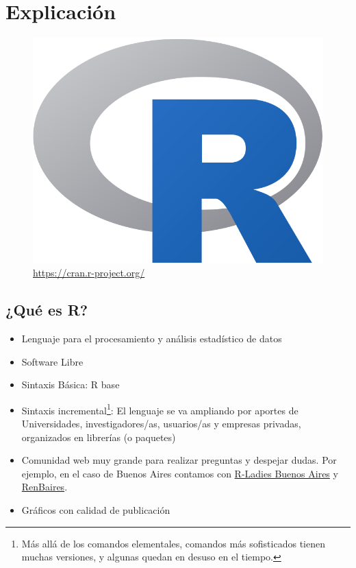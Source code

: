 \documentclass[]{book}
\providecommand{\tightlist}{%
  \setlength{\itemsep}{0pt}\setlength{\parskip}{0pt}}
\let\rmarkdownfootnote\footnote%
\def\footnote{\protect\rmarkdownfootnote}
\begin{document}
\hypertarget{explicacion}{%
\section{Explicación}\label{explicacion}}

\begin{figure}
\centering
\includegraphics[width=5.20833in,height=\textheight]{img/Rlogo.png}
\caption{\url{https://cran.r-project.org/}}
\end{figure}

\hypertarget{que-es-r}{%
\subsection{¿Qué es R?}\label{que-es-r}}

\begin{itemize}
\tightlist
\item
  Lenguaje para el procesamiento y análisis estadístico de datos
\item
  Software Libre
\item
  Sintaxis Básica: R base
\item
  Sintaxis incremental\footnote{Más allá de los comandos elementales, comandos más sofisticados tienen muchas versiones, y algunas quedan en desuso en el tiempo.}: El lenguaje se va ampliando por aportes de Universidades, investigadores/as, usuarios/as y empresas privadas, organizados en librerías (o paquetes)
\item
  Comunidad web muy grande para realizar preguntas y despejar dudas. Por ejemplo, en el caso de Buenos Aires contamos con \href{https://www.meetup.com/es-ES/rladies-buenos-aires/}{R-Ladies Buenos Aires} y \href{https://www.meetup.com/es-ES/renbaires/}{RenBaires}.
\item
  Gráficos con calidad de publicación
\end{itemize}
\end{document}
